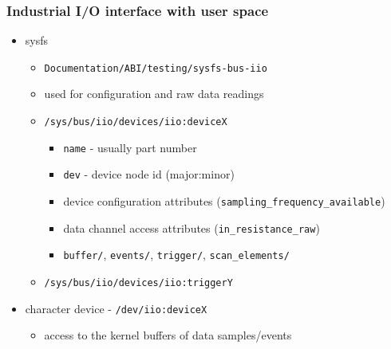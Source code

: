 \documentclass[aspectratio=169]{beamer}
\begin{document}
\begin{frame}
\frametitle{Industrial I/O interface with user space}
\begin{itemize}
    \item sysfs
    \begin{itemize}
        \item \texttt{Documentation/ABI/testing/sysfs-bus-iio}
        \item used for configuration and raw data readings
        \item \texttt{/sys/bus/iio/devices/iio:deviceX}
        \begin{itemize}
            \item \texttt{name} - usually part number
            \item \texttt{dev} - device node id (major:minor)
            \item device configuration attributes (\texttt{sampling\_frequency\_available})
            \item data channel access attributes (\texttt{in\_resistance\_raw})
            \item \texttt{buffer/}, \texttt{events/}, \texttt{trigger/}, \texttt{scan\_elements/}
        \end{itemize}
        \item \texttt{/sys/bus/iio/devices/iio:triggerY}
    \end{itemize}
    \item character device - \texttt{/dev/iio:deviceX}
    \begin{itemize}
        \item access to the kernel buffers of data samples/events
    \end{itemize}
\end{itemize}
\end{frame}




\end{document}
